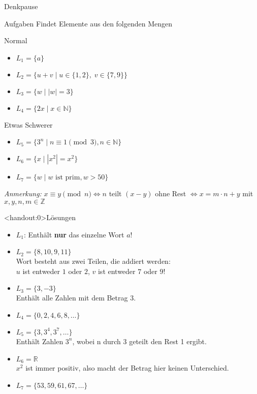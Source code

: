 {
\begin{frame}[fragile]{Denkpause}
    \footnotesize
        \begin{alertblock}{Aufgaben}
            Findet Elemente aus den folgenden Mengen
        \end{alertblock}
        \begin{block}{Normal}
            \begin{itemize}
                \item $L_1 = \{a\}$
                \item $L_2 = \{u+v \mid u\in\{1,2\},\;v\in\{7,9\}\}$
                \item $L_3 = \{w \mid |w| = 3\}$
                \item $L_4 = \{2x \mid x\in \mathbb N\}$
            \end{itemize}
        \end{block}
        \begin{block}{Etwas Schwerer}
            \begin{itemize}
                \item $L_5 = \{3^n \mid n \equiv 1 \pmod 3, n\in\mathbb{N}\}$
                \item $L_6 = \{x \mid |x^2| = x^2\}$
                \item $L_7 = \{w \mid w \text{ ist prim}, w > 50\}$
            \end{itemize}
        \end{block}
        \emph{Anmerkung:} $x \equiv y \pmod n \iff n$ teilt $(x-y)$ ohne Rest $\iff x = m \cdot n + y$ mit $x,y,n,m \in \mathbb{Z}$
\end{frame}
}

{
\begin{frame}<handout:0>{Lösungen}
  \begin{itemize}[<+- | alert@+>]
        \item 
            $L_1$: Enthält \textbf{nur} das einzelne Wort $a$!
        \item
            $L_2 = \{8, 10, 9, 11\}$\\
            Wort besteht aus zwei Teilen, die addiert werden:\\ $u$ ist entweder $1$ oder $2$, $v$ ist entweder $7$ oder $9$!
        \item
            $L_3 = \{3, -3\}$\\
            Enthält alle Zahlen mit dem Betrag $3$.
        \item $L_4 = \{0, 2, 4, 6, 8, \dots \}$
        \item $L_5 = \{3, 3^4, 3^7, \dots\}$\\
            Enthält Zahlen $3^n$, wobei n durch 3 geteilt den Rest 1 ergibt.
        \item
            $L_6 = \mathbb{R}$\\
            $x^2$ ist immer positiv, also macht der Betrag hier keinen Unterschied.
        \item
            $L_7 = \{53, 59, 61, 67, \dots\}$
    \end{itemize}
\end{frame}
}
